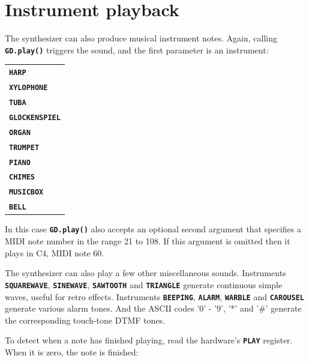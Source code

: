 \documentclass[10pt]{book}
\newcommand{\mach}[1]{\texttt{\textbf{#1}}}
\begin{document}
\section{Instrument playback}

The synthesizer can also produce musical instrument notes.
Again, calling \mach{GD.play()} triggers the sound, and the first parameter
is an instrument:

\label{instruments}

\vspace{10pt}
\begin{tabular}{l}
\mach{HARP} \\
\mach{XYLOPHONE} \\
\mach{TUBA} \\
\mach{GLOCKENSPIEL} \\
\mach{ORGAN} \\
\mach{TRUMPET} \\
\mach{PIANO} \\
\mach{CHIMES} \\
\mach{MUSICBOX} \\
\mach{BELL}
\end{tabular}
\vspace{10pt}

\noindent
In this case \mach{GD.play()} also accepts an optional second argument that specifies a MIDI note number 
in the range 21 to 108. If this argument is omitted then it plays in C4, MIDI note 60.

The synthesizer can also play a few other miscellaneous sounds.
Instruments
\mach{SQUAREWAVE},
\mach{SINEWAVE},
\mach{SAWTOOTH} and
\mach{TRIANGLE}
generate continuous simple waves, useful for retro effects.
Instruments
\mach{BEEPING},
\mach{ALARM},
\mach{WARBLE} and
\mach{CAROUSEL}
generate various alarm tones.
And the ASCII codes '0' - '9', '*' and '\#' generate the corresponding touch-tone DTMF tones.

To detect when a note has finished playing, read the hardware's \mach{PLAY} register.
When it is zero, the note is finished:
\end{document}
